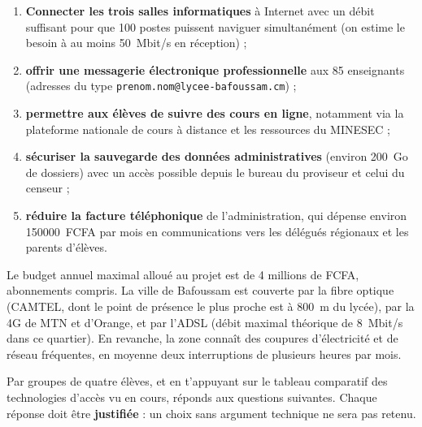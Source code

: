 \documentclass[11pt]{article}
\newcounter{popsec}
\newcounter{popsub}
\newcommand{\courssub}[1]{%
  \stepcounter{popsub}%
  \par\vspace{9pt}\noindent{\popxbold\fontsize{11.5}{13}\selectfont\color{popink}{\color{poporange}\thepopsec.\thepopsub}\hspace{6pt}#1}\par\nopagebreak\vspace{4pt}
}
\begin{document}
\begin{enumerate}
  \item \textbf{Connecter les trois salles informatiques} à Internet avec un débit suffisant pour que 100 postes puissent naviguer simultanément (on estime le besoin à au moins \SI{50}{Mbit/s} en réception) ;
  \item \textbf{offrir une messagerie électronique professionnelle} aux 85 enseignants (adresses du type \texttt{prenom.nom@lycee-bafoussam.cm}) ;
  \item \textbf{permettre aux élèves de suivre des cours en ligne}, notamment via la plateforme nationale de cours à distance et les ressources du MINESEC ;
  \item \textbf{sécuriser la sauvegarde des données administratives} (environ \SI{200}{Go} de dossiers) avec un accès possible depuis le bureau du proviseur et celui du censeur ;
  \item \textbf{réduire la facture téléphonique} de l'administration, qui dépense environ \num{150000}~FCFA par mois en communications vers les délégués régionaux et les parents d'élèves.
\end{enumerate}

Le budget annuel maximal alloué au projet est de 4 millions de FCFA, abonnements compris. La ville de Bafoussam est couverte par la fibre optique (CAMTEL, dont le point de présence le plus proche est à \SI{800}{m} du lycée), par la 4G de MTN et d'Orange, et par l'ADSL (débit maximal théorique de \SI{8}{Mbit/s} dans ce quartier). En revanche, la zone connaît des coupures d'électricité et de réseau fréquentes, en moyenne deux interruptions de plusieurs heures par mois.

\courssub{Consignes}

Par groupes de quatre élèves, et en t'appuyant sur le tableau comparatif des technologies d'accès vu en cours, réponds aux questions suivantes. Chaque réponse doit être \textbf{justifiée} : un choix sans argument technique ne sera pas retenu.
\end{document}
